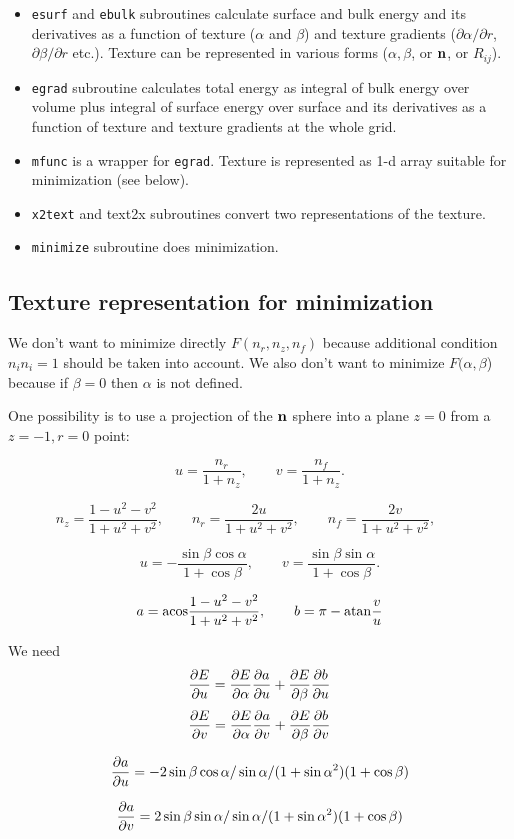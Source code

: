 \documentclass[a4paper]{article}
\begin{document}
\begin{itemize}
\item {\tt esurf} and {\tt ebulk} subroutines calculate surface and
bulk energy and its derivatives as a function of texture ($\alpha$ and
$\beta$) and texture gradients ($\partial\alpha/\partial r$,
$\partial\beta/\partial r$ etc.). Texture can be represented in various
forms ($\alpha, \beta$, or $\bf n$, or $R_{ij}$).

\item {\tt egrad} subroutine calculates total energy as integral of bulk energy over volume
plus integral of surface energy over surface and its derivatives as a
function of texture and texture gradients at the whole grid.

\item {\tt mfunc} is a wrapper for {\tt egrad}. Texture is represented
as 1-d array suitable for minimization (see below).

\item {\tt x2text} and {text2x} subroutines convert two representations of the texture.

\item {\tt minimize} subroutine does minimization.
\end{itemize}



\subsection*{Texture representation for minimization}

We don't want to minimize directly $F(n_r, n_z, n_f)$ because additional
condition $n_i n_i = 1$ should be taken into account. We also don't want
to minimize $F(\alpha, \beta$) because if $\beta=0$ then $\alpha$
is not defined.

One possibility is to use a projection of the $\bf n$ sphere into a plane
$z=0$ from a $z=-1, r=0$ point:

$$
u=\frac{n_r}{1+n_z}, \qquad  v=\frac{n_f}{1+n_z}.
$$

$$
n_z = \frac{1-u^2-v^2}{1+u^2+v^2},\qquad
n_r = \frac{2u}{1+u^2+v^2},\qquad
n_f = \frac{2v}{1+u^2+v^2},\qquad
$$

\def\cb{\cos\beta}
\def\sb{\sin\beta}
\def\ca{\cos\alpha}
\def\sa{\sin\alpha}

$$
u=-\frac{\sb\ca}{1+\cb}, \qquad  v=\frac{\sb\sa}{1+\cb}.
$$

$$
a={\rm acos}\frac{1-u^2-v^2}{1+u^2+v^2}, \qquad b=\pi-{\rm atan}\frac{v}{u}
$$


We need
$$
\frac{\partial E}{\partial u} = \frac{\partial E}{\partial \alpha}\frac{\partial a}{\partial u} + \frac{\partial E}{\partial \beta}\frac{\partial b}{\partial u}
$$
$$
\frac{\partial E}{\partial v} = \frac{\partial E}{\partial \alpha}\frac{\partial a}{\partial v} + \frac{\partial E}{\partial \beta}\frac{\partial b}{\partial v}
$$

$$
\ddd{a}{u} = -2\sb\ca/\sa  / (1+\sa^2)(1+\cb)
$$

$$
\ddd{a}{v} = 2\sb\sa/\sa  / (1+\sa^2)(1+\cb)
$$
\end{document}
